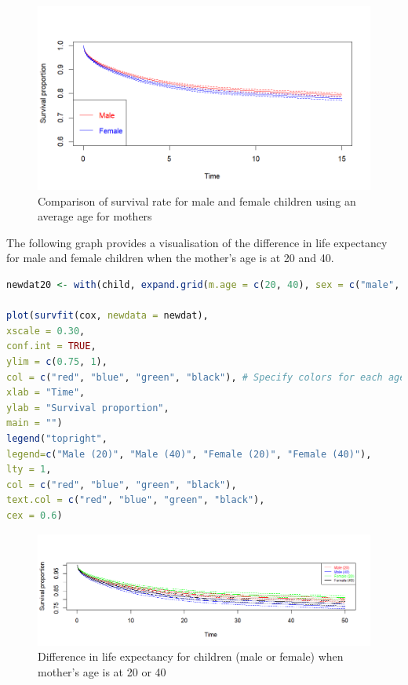 \documentclass[12pt,letterpaper]{article}
\begin{document}
\begin{figure}[htbp]
	\centering
	\includegraphics[width=1\linewidth]{Rplot03}
	\caption{Comparison of survival rate for male and female children using an average age for mothers}
	\label{fig:rplot01}
\end{figure}

\newpage
\noindent The following graph provides a visualisation of the difference in life expectancy for male and female children when the mother's age is at 20 and 40.

\begin{lstlisting}[language=R]
newdat20 <- with(child, expand.grid(m.age = c(20, 40), sex = c("male", "female")))

plot(survfit(cox, newdata = newdat), 
xscale = 0.30,
conf.int = TRUE,
ylim = c(0.75, 1),
col = c("red", "blue", "green", "black"), # Specify colors for each age group and sex
xlab = "Time",
ylab = "Survival proportion",
main = "")
legend("topright",
legend=c("Male (20)", "Male (40)", "Female (20)", "Female (40)"), 
lty = 1, 
col = c("red", "blue", "green", "black"),
text.col = c("red", "blue", "green", "black"),
cex = 0.6)

\end{lstlisting}

\begin{figure}[htbp]
	\centering
	\includegraphics[width=1\linewidth, height=0.3\textheight]{Rplot04}
	\caption{Difference in life expectancy for children (male or female) when mother's age is at 20 or 40}
	\label{fig:rplot04}
\end{figure}
\end{document}
